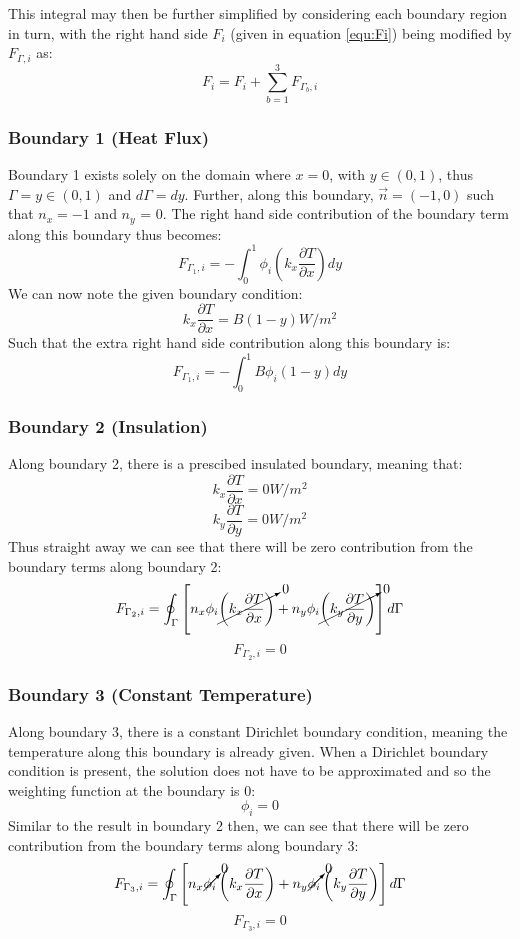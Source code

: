 \documentclass[letterpaper,10pt]{article}
\begin{document}
\noindent This integral may then be further simplified by considering each boundary region in turn, with the right hand side $F_i$ (given in equation \ref{equ:Fi}) being modified by $F_{\Gamma,i}$ as:
\[
\boxed{F_i = F_i + \displaystyle\sum\limits_{b=1}^3 F_{\Gamma_b,i}}
\]

\subsubsection{Boundary 1 (Heat Flux)}
Boundary 1 exists solely on the domain where $x=0$, with $y \in (0, 1)$, thus $\Gamma = y \in (0, 1)$ and $d\Gamma = dy$. Further, along this boundary, $\vec{n} = \left(-1,0\right)$ such that $n_x=-1$ and $n_y$ = 0. The right hand side contribution of the boundary term along this boundary thus becomes:
\[F_{\Gamma_1,i} = -\int_0^1 \phi_i\left(k_x\frac{\partial T}{\partial x}\right)dy\]
We can now note the given boundary condition:
\[k_x\frac{\partial T}{\partial x} = B \left(1-y\right) \unit{}{W/m^2}\]
Such that the extra right hand side contribution along this boundary is:
\begin{equation}
\label{equ:F1i}
\boxed{F_{\Gamma_1,i} = -\int_0^1 B \phi_i \left(1-y\right)dy}
\end{equation}

\subsubsection{Boundary 2 (Insulation)}
Along boundary 2, there is a prescibed insulated boundary, meaning that:
\[k_x\frac{\partial T}{\partial x} = \unit{0}{W/m^2}\]
\[k_y\frac{\partial T}{\partial y} = \unit{0}{W/m^2}\]
\noindent Thus straight away we can see that there will be zero contribution from the boundary terms along boundary 2:
\[
F_{\Gamma_2,i} = \oint_\Gamma \left[n_x\phi_i\cancelto{0}{\left(k_x\frac{\partial T}{\partial x}\right)} + n_y\phi_i\cancelto{0}{\left(k_y\frac{\partial T}{\partial y}\right)}\right]d\Gamma
\]
\begin{equation}
\label{equ:F2i}
\boxed{F_{\Gamma_2,i} = 0}
\end{equation}

\subsubsection{Boundary 3 (Constant Temperature)}
Along boundary 3, there is a constant Dirichlet boundary condition, meaning the temperature along this boundary is already given. When a Dirichlet boundary condition is present, the solution does not have to be approximated and so the weighting function at the boundary is 0:
\[\phi_i = 0\]
\noindent Similar to the result in boundary 2 then, we can see that there will be zero contribution from the boundary terms along boundary 3:
\[
F_{\Gamma_3,i} = \oint_\Gamma \left[n_x\cancelto{0}{\phi_i}\left(k_x\frac{\partial T}{\partial x}\right) + n_y\cancelto{0}{\phi_i}\left(k_y\frac{\partial T}{\partial y}\right)\right]d\Gamma
\]
\begin{equation}
\label{equ:F3i}
\boxed{F_{\Gamma_3,i} = 0}
\end{equation}
\end{document}
